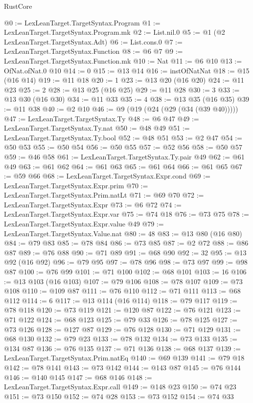 \begin{lexlean}{RustCore}
\begin{coremodule}
@0 := LexLeanTarget.TargetSyntax.Program
@1 := LexLeanTarget.TargetSyntax.Program.mk
@2 := List.nil.{0}
@5 := @1 (@2 LexLeanTarget.TargetSyntax.Adt)
@6 := List.cons.{0}
@7 := LexLeanTarget.TargetSyntax.Function
@8 := @6 @7
@9 := LexLeanTarget.TargetSyntax.Function.mk
@10 := Nat
@11 := @6 @10
@13 := OfNat.ofNat.{0} @10
@14 := 0
@15 := @13 @14
@16 := instOfNatNat
@18 := @15 (@16 @14)
@19 := @11 @18
@20 := 1
@23 := @13 @20 (@16 @20)
@24 := @11 @23
@25 := 2
@28 := @13 @25 (@16 @25)
@29 := @11 @28
@30 := 3
@33 := @13 @30 (@16 @30)
@34 := @11 @33
@35 := 4
@38 := @13 @35 (@16 @35)
@39 := @11 @38
@40 := @2 @10
@46 := @9 (@19 (@24 (@29 (@34 (@39 @40)))))
@47 := LexLeanTarget.TargetSyntax.Ty
@48 := @6 @47
@49 := LexLeanTarget.TargetSyntax.Ty.nat
@50 := @48 @49
@51 := LexLeanTarget.TargetSyntax.Ty.bool
@52 := @48 @51
@53 := @2 @47
@54 := @50 @53
@55 := @50 @54
@56 := @50 @55
@57 := @52 @56
@58 := @50 @57
@59 := @46 @58
@61 := LexLeanTarget.TargetSyntax.Ty.pair @49
@62 := @61 @49
@63 := @61 @62
@64 := @61 @63
@65 := @61 @64
@66 := @61 @65
@67 := @59 @66
@68 := LexLeanTarget.TargetSyntax.Expr.cond
@69 := LexLeanTarget.TargetSyntax.Expr.prim
@70 := LexLeanTarget.TargetSyntax.Prim.natLt
@71 := @69 @70
@72 := LexLeanTarget.TargetSyntax.Expr
@73 := @6 @72
@74 := LexLeanTarget.TargetSyntax.Expr.var
@75 := @74 @18
@76 := @73 @75
@78 := LexLeanTarget.TargetSyntax.Expr.value @49
@79 := LexLeanTarget.TargetSyntax.Value.nat
@80 := 48
@83 := @13 @80 (@16 @80)
@84 := @79 @83
@85 := @78 @84
@86 := @73 @85
@87 := @2 @72
@88 := @86 @87
@89 := @76 @88
@90 := @71 @89
@91 := @68 @90
@92 := 32
@95 := @13 @92 (@16 @92)
@96 := @79 @95
@97 := @78 @96
@98 := @73 @97
@99 := @98 @87
@100 := @76 @99
@101 := @71 @100
@102 := @68 @101
@103 := 16
@106 := @13 @103 (@16 @103)
@107 := @79 @106
@108 := @78 @107
@109 := @73 @108
@110 := @109 @87
@111 := @76 @110
@112 := @71 @111
@113 := @68 @112
@114 := 6
@117 := @13 @114 (@16 @114)
@118 := @79 @117
@119 := @78 @118
@120 := @73 @119
@121 := @120 @87
@122 := @76 @121
@123 := @71 @122
@124 := @68 @123
@125 := @79 @33
@126 := @78 @125
@127 := @73 @126
@128 := @127 @87
@129 := @76 @128
@130 := @71 @129
@131 := @68 @130
@132 := @79 @23
@133 := @78 @132
@134 := @73 @133
@135 := @134 @87
@136 := @76 @135
@137 := @71 @136
@138 := @68 @137
@139 := LexLeanTarget.TargetSyntax.Prim.natEq
@140 := @69 @139
@141 := @79 @18
@142 := @78 @141
@143 := @73 @142
@144 := @143 @87
@145 := @76 @144
@146 := @140 @145
@147 := @68 @146
@148 := LexLeanTarget.TargetSyntax.Expr.call
@149 := @148 @23
@150 := @74 @23
@151 := @73 @150
@152 := @74 @28
@153 := @73 @152
@154 := @74 @33

\end{coremodule}
\end{lexlean}
